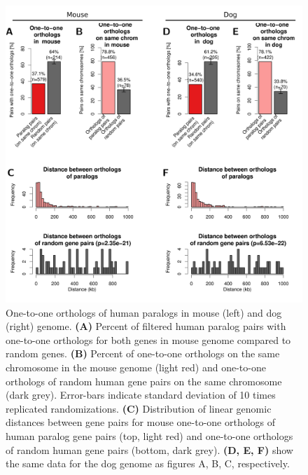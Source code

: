 \documentclass[a4paper,twoside=true,openright,parskip=full,chapterprefix=true,11pt,headings=normal,bibliography=totoc,listof=totoc,titlepage=on,captions=tableabove,draft=false]{scrreprt}
\theoremstyle{definition}
\theoremstyle{definition}
\theoremstyle{definition}
\theoremstyle{remark}
\begin{document}
\begin{figure}

{\centering \includegraphics[width=0.8\linewidth]{figures/paralog/SI/figS13} 

}

\caption{One-to-one orthologs of human paralogs in mouse
(left) and dog (right) genome. \textbf{(A)} Percent of filtered human
paralog pairs with one-to-one orthologs for both genes in mouse genome
compared to random genes. \textbf{(B)} Percent of one-to-one orthologs
on the same chromosome in the mouse genome (light red) and one-to-one
orthologs of random human gene pairs on the same chromosome (dark grey).
Error-bars indicate standard deviation of 10 times replicated
randomizations. \textbf{(C)} Distribution of linear genomic distances
between gene pairs for mouse one-to-one orthologs of human paralog gene
pairs (top, light red) and one-to-one orthologs of random human gene
pairs (bottom, dark grey). \textbf{(D, E, F)} show the same data for the
dog genome as figures A, B, C, respectively.}\label{fig:orthologsSpecies}
\end{figure}
\end{document}
